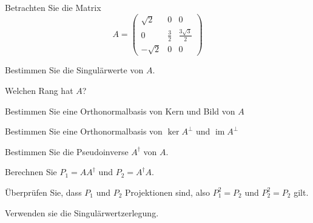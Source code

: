 Betrachten Sie die Matrix
\[
A=
\begin{pmatrix}
\sqrt{2} & 0 & 0 \\
0 & \frac32 & \frac{3\sqrt{3}}2 \\
-\sqrt{2} & 0 & 0
\end{pmatrix}
\]
\begin{teilaufgaben}
\item Bestimmen Sie die Singulärwerte von $A$.
\item Welchen Rang hat $A$?
\item Bestimmen Sie eine Orthonormalbasis von Kern und Bild von $A$
\item Bestimmen Sie eine Orthonormalbasis von $\operatorname{ker}A^\perp$
und $\operatorname{im}A^\perp$
\item Bestimmen Sie die Pseudoinverse $A^\dagger$ von $A$.
\item Berechnen Sie $P_1=AA^\dagger$ und $P_2=A^\dagger A$.
\item Überprüfen Sie, dass $P_1$ und $P_2$ Projektionen sind, also
$P_1^2=P_2$ und $P_2^2=P_2$ gilt.
\end{teilaufgaben}

\begin{hinweis}
Verwenden sie die Singulärwertzerlegung.
\end{hinweis}

